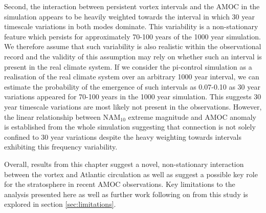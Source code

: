 Second, the interaction between persistent vortex intervals and the AMOC in the simulation appears to be heavily weighted towards the interval in which 30 year timescale variations in both modes dominate. This variability is a non-stationary feature which persists for approximately 70-100 years of the 1000 year simulation. We therefore assume that such variability is also realistic within the observational record and the validity of this assumption may rely on whether such an interval is present in the real climate system. If we consider the pi-control simulation as a realisation of the real climate system over an arbitrary 1000 year interval, we can estimate the probability of the emergence of such intervals as 0.07-0.10 as 30 year variations appeared for 70-100 years in the 1000 year simulation. This suggests 30 year timescale variations are most likely not present in the observations. However, the linear relationship between NAM$_{10}$ extreme magnitude and AMOC anomaly is established from the whole simulation suggesting that connection is not solely confined to 30 year variations despite the heavy weighting towards intervals exhibiting this frequency variability.

Overall, results from this chapter suggest a novel, non-stationary interaction between the vortex and Atlantic circulation as well as suggest a possible key role for the stratosphere in recent AMOC observations. Key limitations to the analysis presented here as well as further work following on from this study is explored in section \ref{sec:limitations}.






